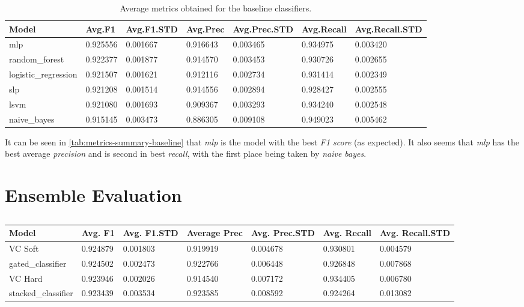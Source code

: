 \documentclass[epsfig,a4paper,11pt,titlepage,twoside,openany]{book}
\begin{document}
\begin{table}[H]
\centering
\begin{tabular}{l|l|l|l|l|l|l}
Model                             & Avg.F1 & Avg.F1.STD & Avg.Prec & Avg.Prec.STD & Avg.Recall & Avg.Recall.STD \\ \hline
mlp          & 0.925556   & 0.001667       & 0.916643     & 0.003465         & 0.934975       & 0.003420           \\
random\_forest                    & 0.922377   & 0.001877       & 0.914570     & 0.003453         & 0.930726       & 0.002655           \\
logistic\_regression              & 0.921507   & 0.001621       & 0.912116     & 0.002734         & 0.931414       & 0.002349           \\
slp         & 0.921208   & 0.001514       & 0.914556     & 0.002894         & 0.928427       & 0.002555           \\
lsvm & 0.921080   & 0.001693       & 0.909367     & 0.003293         & 0.934240       & 0.002548           \\
naive\_bayes                      & 0.915145   & 0.003473       & 0.886305     & 0.009108         & 0.949023       & 0.005462          
\end{tabular}
\caption{Average metrics obtained for the baseline classifiers.}
\label{tab:metrics-summary-baseline}
\end{table}


It can be seen in \autoref{tab:metrics-summary-baseline} that \textit{mlp} is the model with the best \textit{F1 score} (as expected). It also seems that \textit{mlp} has the best average \textit{precision} and is second in best \textit{recall}, with the first place being taken by \textit{naive bayes}.


\section{Ensemble Evaluation}
\label{sec:ensemble-evaluation}

\begin{table}[H]
\centering
\begin{tabular}{l|l|l|l|l|l|l}
Model                    & Avg. F1 & Avg. F1.STD & Average Prec & Avg. Prec.STD & Avg. Recall & Avg. Recall.STD \\ \hline
VC Soft & 0.924879   & 0.001803       & 0.919919     & 0.004678         & 0.930801       & 0.004579           \\
gated\_classifier        & 0.924502   & 0.002473       & 0.922766     & 0.006448         & 0.926848       & 0.007868           \\
VC Hard & 0.923946   & 0.002026       & 0.914540     & 0.007172         & 0.934405       & 0.006780           \\
stacked\_classifier      & 0.923439   & 0.003534       & 0.923585     & 0.008592         & 0.924264       & 0.013082          
\end{tabular}
\caption{}
\label{tab:metrics-summary-for-ensembles}
\end{table}
\end{document}
